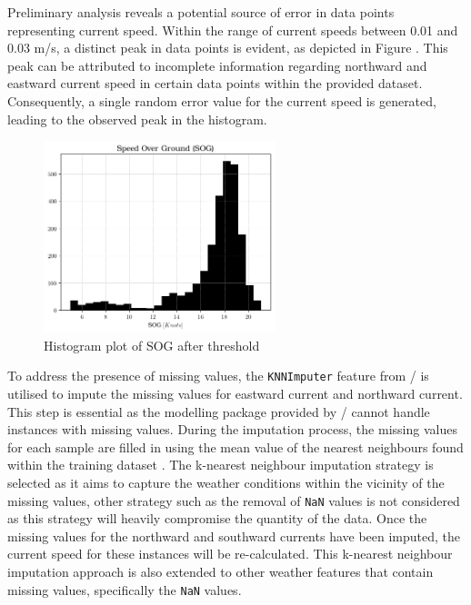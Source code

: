 Preliminary analysis reveals a potential source of error in data points representing current speed. Within the range of current speeds between 0.01 and 0.03 m/s, a distinct peak in data points is evident, as depicted in Figure . This peak can be attributed to incomplete information regarding northward and eastward current speed in certain data points within the provided dataset. Consequently, a single random error value for the current speed is generated, leading to the observed peak in the histogram.\\

\begin{figure}[h]
    \centering
        \includegraphics[width=0.6\textwidth]{02_figures/hist_init_sog_postfilter.png}
        \caption{Histogram plot of SOG after threshold}
        \label{fig:SOG_greater_five}
\end{figure}

To address the presence of missing values, the \texttt{KNNImputer} feature from \scikit/ is utilised to impute the missing values for eastward current and northward current. This step is essential as the modelling package provided by \scikit/ cannot handle instances with missing values. During the imputation process, the missing values for each sample are filled in using the mean value of the nearest neighbours found within the training dataset . The k-nearest neighbour imputation strategy is selected as it aims to capture the weather conditions within the vicinity of the missing values, other strategy such as the removal of \texttt{NaN} values is not considered as this strategy will heavily compromise the quantity of the data. Once the missing values for the northward and southward currents have been imputed, the current speed for these instances will be re-calculated. This k-nearest neighbour imputation approach is also extended to other weather features that contain missing values, specifically the \texttt{NaN} values.\\

